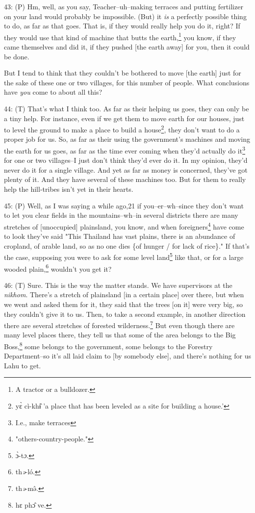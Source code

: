 43: (P) Hm, well, as you say, Teacher--uh--making terraces and putting fertilizer
on your land would probably be impossible. (But) it \textit{is} a perfectly possible
thing to do, as far as that goes. That is, if they would really help you do it,
right? If they would use that kind of machine that butts the earth,\footnote{A tractor or a bulldozer.} you know,
if they came themselves and did it, if they pushed [the earth away] for you, then
it could be done.

But I tend to think that they couldn't be bothered to move [the earth] just for
the sake of these one or two villages, for this number of people. What conclusions
have \textit{you} come to about all this?

44: (T) That's what I think too. As far as their helping us goes, they can only
be a tiny help. For instance, even if we get them to move earth for our houses,
just to level the ground to make a place to build a house\footnote{yɛ̀ cì-khɨ̂ 'a place that has been leveled as a site for building a house.'}, they don't want
to do a proper job for us. So, as far as their using the government's machines
and moving the earth for us goes, as far as the time ever coming when they'd actually
do it\footnote{I.e., make terraces} for one or two villages--I just don't think they'd ever do it. In my
opinion, they'd never do it for a single village. And yet as far as money is concerned,
they've got plenty of it. And they have several of these machines too. But for
them to really help the hill-tribes isn't yet in their hearts.

45: (P) Well, as I was saying a while ago,21 if you--er--wh--since they don't want
to let you clear fields in the mountains--wh--in several districts there are many
stretches of [unoccupied] plainsland, you know, and when foreigners\footnote{"others-country-people."} have come
to look they've said "This Thailand has vast plains, there is an abundance
of cropland, of arable land, so as no one dies \{of hunger / for lack of rice\}."
If that's the case, supposing you were to ask for some level land\footnote{ɔ̀-t\emph{ɔ}.} like that,
or for a large wooded plain,\footnote{th\emph{ə}-ló.} wouldn't you get it?

46: (T) Sure. This is the way the matter stands. We have supervisors at the \textit{nikhom}.
There's a stretch of plainsland [in a certain place] over there, but when we went
and asked them for it, they said that the trees [on it] were very big, so they
couldn't give it to us. Then, to take a second example, in another direction there
are several stretches of forested wilderness.\footnote{th\emph{ə}-mə̂.} But even though there are many
level places there, they tell us that some of the area belongs to the Big Boss,\footnote{hɛ phɔ̂ ve.}
some belongs to the government, some belongs to the Forestry Department--so it's
all laid claim to [by somebody else], and there's nothing for us Lahu to get.

